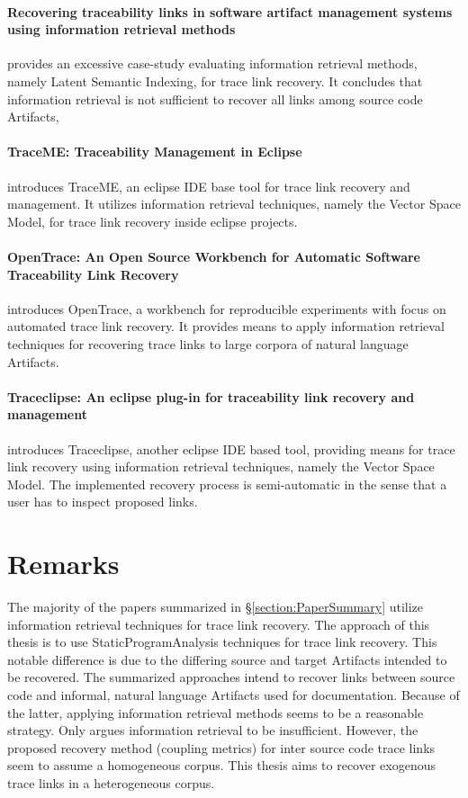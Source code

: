 \paragraph*{Recovering traceability links in software artifact management systems using information retrieval methods}
\cite{Lucia:2007:RTL:1276933.1276934}
provides an excessive case-study evaluating information retrieval methods, namely Latent Semantic Indexing, for trace link recovery.
It concludes that information retrieval is not sufficient to recover all links among source code \glspl{Artifact}, 

\paragraph*{TraceME: Traceability Management in Eclipse}
\cite{TraceME}
introduces TraceME, an eclipse \gls{IDE} base tool for trace link recovery and management.
It utilizes information retrieval techniques, namely the Vector Space Model, for trace link recovery inside eclipse projects.

\paragraph*{OpenTrace: An Open Source Workbench for Automatic Software Traceability Link Recovery}
\cite{OpenTrace}
introduces OpenTrace, a workbench for reproducible experiments with focus on automated trace link recovery.
It provides means to apply information retrieval techniques for recovering trace links to large corpora of natural language \glspl{Artifact}.

\paragraph*{Traceclipse: An eclipse plug-in for traceability link recovery and management}
\cite{Traceclipse}
introduces Traceclipse, another eclipse \gls{IDE} based tool, providing means for trace link recovery using information retrieval techniques, namely the Vector Space Model.
The implemented recovery process is semi-automatic in the sense that a user has to inspect proposed links.

\section{Remarks}
\label{section:Remarks}
The majority of the papers summarized in §\ref{section:PaperSummary} utilize information retrieval techniques for trace link recovery.
The approach of this thesis is to use \gls{StaticProgramAnalysis} techniques for trace link recovery.
This notable difference is due to the differing source and target \glspl{Artifact} intended to be recovered.
The summarized approaches intend to recover links between source code and informal, natural language \glspl{Artifact} used for documentation.
Because of the latter, applying information retrieval methods seems to be a reasonable strategy.
Only \cite{McMillanPR2009} argues information retrieval to be insufficient.
However, the proposed recovery method (coupling metrics) for inter source code trace links seem to assume a homogeneous corpus.
This thesis aims to recover exogenous trace links in a heterogeneous corpus.
 

